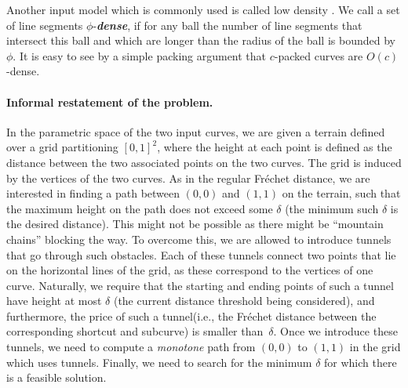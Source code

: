 \documentclass[12pt]{article}
\newcommand{\emphic}[2]{\textcolor{blue25}{\textbf{\emph{#1}}}\index{#2}}
\newcommand{\emphi}[1]{\emphic{#1}{#1}}
\newcommand{\Frechet}{Fr\'{e}c{h}e{}t\xspace}\providecommand{\Arr}{\mathop{\mathrm{\EuScript{A}}}}
\newcommand{\tunnel}{tunnel\xspace}
\newcommand{\tunnels}{tunnels\xspace}
\numberwithin{figure}{section}
\numberwithin{equation}{section}
\begin{document}
Another input model which is commonly used is called low density
\cite{bksv-rimga-02}.  We call a set of line segments
$\phi$-\emphi{dense}, if for any ball the number of line segments that
intersect this ball and which are longer than the radius of the ball
is bounded by $\phi$. It is easy to see by a simple packing argument
that $c$-packed curves are $O(c)$-dense.



\paragraph{Informal restatement of the problem.} 

In the parametric space of the two input curves, we are given a
terrain defined over a grid partitioning $[0,1]^2$, where the height
at each point is defined as the distance between the two associated
points on the two curves. The grid is induced by the vertices of the
two curves. As in the regular \Frechet distance, we are interested in
finding a path between $(0,0)$ and $(1,1)$ on the terrain, such that
the maximum height on the path does not exceed some $\delta$ (the
minimum such $\delta$ is the desired distance). This might not be
possible as there might be ``mountain chains'' blocking the way.  To
overcome this, we are allowed to introduce \tunnels that go through
such obstacles. Each of these \tunnels connect two points that lie on
the horizontal lines of the grid, as these correspond to the vertices
of one curve. Naturally, we require that the starting and ending
points of such a \tunnel have height at most $\delta$ (the current
distance threshold being considered), and furthermore, the price of
such a \tunnel (i.e., the \Frechet distance between the corresponding
shortcut and subcurve) is smaller than~$\delta$. Once we introduce
these \tunnels, we need to compute a \emph{monotone} path from $(0,0)$
to $(1,1)$ in the grid which uses \tunnels.  Finally, we need to
search for the minimum $\delta$ for which there is a feasible
solution.
\end{document}
